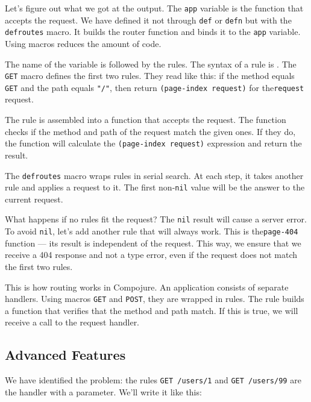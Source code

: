 \fi

Let's figure out what we got at the output. The \verb|app| variable is the function that accepts the request. We have defined it not through \verb|def| or \verb|defn| but with
the \verb|defroutes| macro. It builds the router function and binds it to the \verb|app| variable. Using macros reduces the amount of code.

The name of the variable is followed by the rules. The syntax of a rule is .
The \verb|GET| macro defines the first two rules. They read like this:
if the method equals \verb|GET| and the path equals \verb|"/"|, then return \verb|(page-index request)| for the\verb|request| request.


The rule is assembled into a function that accepts the request. The function checks if the method and path of the request match the given ones. If they do, the function will calculate the \verb|(page-index request)| expression and return the result.

The \verb|defroutes| macro wraps rules in serial search. At each step, it takes another rule and applies a request to it. The first non-\verb|nil| value will be the answer to the current request.

What happens if no rules fit the request? The \verb|nil| result will cause a server error. To avoid \verb|nil|, let's add another rule that will always work. This is the\verb|page-404| function — its result is independent of the request. This way, we ensure that we receive a 404 response and not a type error, even if the request does not match the first two rules.

This is how routing works in Compojure. An application consists of separate handlers. Using macros \verb|GET| and \verb|POST|, they are wrapped in rules. The rule builds a function that verifies that the method and path match. If this is true, we will receive a call to the request handler.

\subsection{Advanced Features}

We have identified the problem: the rules \verb|GET /users/1| and \verb|GET /users/99| are the handler with a parameter. We'll write it like this:


\ifx\DEVICETYPE\MOBILE

